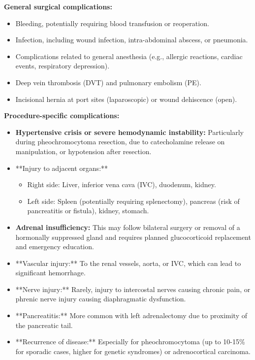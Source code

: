 \textbf{General surgical complications:}

\begin{itemize}
  \item Bleeding, potentially requiring blood transfusion or reoperation.
  \item Infection, including wound infection, intra-abdominal abscess, or pneumonia.
  \item Complications related to general anesthesia (e.g., allergic reactions, cardiac events, respiratory depression).
  \item Deep vein thrombosis (DVT) and pulmonary embolism (PE).
  \item Incisional hernia at port sites (laparoscopic) or wound dehiscence (open).
\end{itemize}

\textbf{Procedure-specific complications:}

\begin{itemize}
  \item \textbf{Hypertensive crisis or severe hemodynamic instability:} Particularly during pheochromocytoma resection, due to catecholamine release on manipulation, or hypotension after resection.
  \item **Injury to adjacent organs:**
    \begin{itemize}
      \item Right side: Liver, inferior vena cava (IVC), duodenum, kidney.
      \item Left side: Spleen (potentially requiring splenectomy), pancreas (risk of pancreatitis or fistula), kidney, stomach.
    \end{itemize}
  \item \textbf{Adrenal insufficiency:} This may follow bilateral surgery or removal of a hormonally suppressed gland and requires planned glucocorticoid replacement and emergency education.
  \item **Vascular injury:** To the renal vessels, aorta, or IVC, which can lead to significant hemorrhage.
  \item **Nerve injury:** Rarely, injury to intercostal nerves causing chronic pain, or phrenic nerve injury causing diaphragmatic dysfunction.
  \item **Pancreatitis:** More common with left adrenalectomy due to proximity of the pancreatic tail.
  \item **Recurrence of disease:** Especially for pheochromocytoma (up to 10-15\% for sporadic cases, higher for genetic syndromes) or adrenocortical carcinoma.
\end{itemize}

